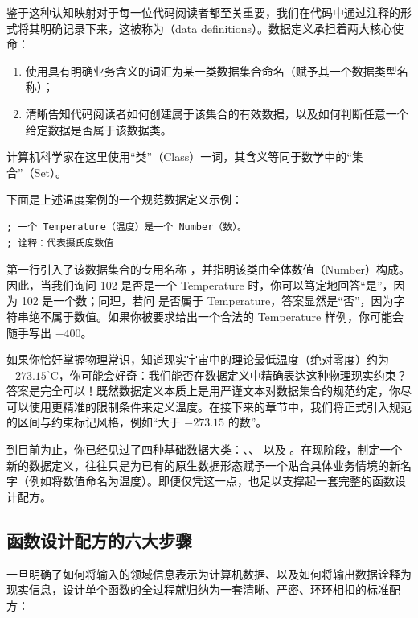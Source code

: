 鉴于这种认知映射对于每一位代码阅读者都至关重要，我们在代码中通过注释的形式将其明确记录下来，这被称为（data definitions）。数据定义承担着两大核心使命：
\begin{enumerate}
  \item 使用具有明确业务含义的词汇为某一类数据集合命名（赋予其一个数据类型名称）；
  \item 清晰告知代码阅读者如何创建属于该集合的有效数据，以及如何判断任意一个给定数据是否属于该数据类。
\end{enumerate}

\begin{notebox}
计算机科学家在这里使用“类”（Class）一词，其含义等同于数学中的“集合”（Set）。
\end{notebox}

下面是上述温度案例的一个规范数据定义示例：
\begin{lstlisting}[language=BSL]
; 一个 Temperature（温度）是一个 Number（数）。
; 诠释：代表摄氏度数值
\end{lstlisting}

第一行引入了该数据集合的专用名称 ，并指明该类由全体数值（Number）构成。因此，当我们询问 102 是否是一个 Temperature 时，你可以笃定地回答“是”，因为 102 是一个数；同理，若问  是否属于 Temperature，答案显然是“否”，因为字符串绝不属于数值。如果你被要求给出一个合法的 Temperature 样例，你可能会随手写出 $-400$。

如果你恰好掌握物理常识，知道现实宇宙中的理论最低温度（绝对零度）约为 $-273.15^\circ\text{C}$，你可能会好奇：我们能否在数据定义中精确表达这种物理现实约束？答案是完全可以！既然数据定义本质上是用严谨文本对数据集合的规范约定，你尽可以使用更精准的限制条件来定义温度。在接下来的章节中，我们将正式引入规范的区间与约束标记风格，例如“大于 $-273.15$ 的数”。

到目前为止，你已经见过了四种基础数据大类：、、 以及 。在现阶段，制定一个新的数据定义，往往只是为已有的原生数据形态赋予一个贴合具体业务情境的新名字（例如将数值命名为温度）。即便仅凭这一点，也足以支撑起一套完整的函数设计配方。

\subsection{函数设计配方的六大步骤}

一旦明确了如何将输入的领域信息表示为计算机数据、以及如何将输出数据诠释为现实信息，设计单个函数的全过程就归纳为一套清晰、严密、环环相扣的标准配方：

